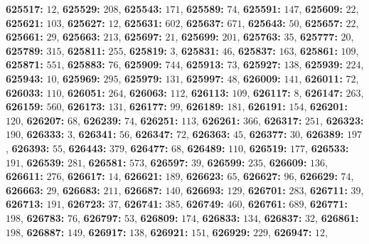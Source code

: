 \textsf{\bfseries 625517:} $12$, \textsf{\bfseries 625529:} $208$, \textsf{\bfseries 625543:} $171$, \textsf{\bfseries 625589:} $74$, \textsf{\bfseries 625591:} $147$, \textsf{\bfseries 625609:} $22$, \textsf{\bfseries 625621:} $103$, \textsf{\bfseries 625627:} $12$, \textsf{\bfseries 625631:} $602$, \textsf{\bfseries 625637:} $671$, \textsf{\bfseries 625643:} $50$, \textsf{\bfseries 625657:} $22$, \textsf{\bfseries 625661:} $29$, \textsf{\bfseries 625663:} $213$, \textsf{\bfseries 625697:} $21$, \textsf{\bfseries 625699:} $201$, \textsf{\bfseries 625763:} $35$, \textsf{\bfseries 625777:} $20$, \textsf{\bfseries 625789:} $315$, \textsf{\bfseries 625811:} $255$, \textsf{\bfseries 625819:} $3$, \textsf{\bfseries 625831:} $46$, \textsf{\bfseries 625837:} $163$, \textsf{\bfseries 625861:} $109$, \textsf{\bfseries 625871:} $551$, \textsf{\bfseries 625883:} $76$, \textsf{\bfseries 625909:} $744$, \textsf{\bfseries 625913:} $73$, \textsf{\bfseries 625927:} $138$, \textsf{\bfseries 625939:} $224$, \textsf{\bfseries 625943:} $10$, \textsf{\bfseries 625969:} $295$, \textsf{\bfseries 625979:} $131$, \textsf{\bfseries 625997:} $48$, \textsf{\bfseries 626009:} $141$, \textsf{\bfseries 626011:} $72$, \textsf{\bfseries 626033:} $110$, \textsf{\bfseries 626051:} $264$, \textsf{\bfseries 626063:} $112$, \textsf{\bfseries 626113:} $109$, \textsf{\bfseries 626117:} $8$, \textsf{\bfseries 626147:} $263$, \textsf{\bfseries 626159:} $560$, \textsf{\bfseries 626173:} $131$, \textsf{\bfseries 626177:} $99$, \textsf{\bfseries 626189:} $181$, \textsf{\bfseries 626191:} $154$, \textsf{\bfseries 626201:} $120$, \textsf{\bfseries 626207:} $68$, \textsf{\bfseries 626239:} $74$, \textsf{\bfseries 626251:} $113$, \textsf{\bfseries 626261:} $366$, \textsf{\bfseries 626317:} $251$, \textsf{\bfseries 626323:} $190$, \textsf{\bfseries 626333:} $3$, \textsf{\bfseries 626341:} $56$, \textsf{\bfseries 626347:} $72$, \textsf{\bfseries 626363:} $45$, \textsf{\bfseries 626377:} $30$, \textsf{\bfseries 626389:} $197$, \textsf{\bfseries 626393:} $55$, \textsf{\bfseries 626443:} $379$, \textsf{\bfseries 626477:} $68$, \textsf{\bfseries 626489:} $110$, \textsf{\bfseries 626519:} $177$, \textsf{\bfseries 626533:} $191$, \textsf{\bfseries 626539:} $281$, \textsf{\bfseries 626581:} $573$, \textsf{\bfseries 626597:} $39$, \textsf{\bfseries 626599:} $235$, \textsf{\bfseries 626609:} $136$, \textsf{\bfseries 626611:} $276$, \textsf{\bfseries 626617:} $14$, \textsf{\bfseries 626621:} $189$, \textsf{\bfseries 626623:} $65$, \textsf{\bfseries 626627:} $96$, \textsf{\bfseries 626629:} $74$, \textsf{\bfseries 626663:} $29$, \textsf{\bfseries 626683:} $211$, \textsf{\bfseries 626687:} $140$, \textsf{\bfseries 626693:} $129$, \textsf{\bfseries 626701:} $283$, \textsf{\bfseries 626711:} $39$, \textsf{\bfseries 626713:} $191$, \textsf{\bfseries 626723:} $37$, \textsf{\bfseries 626741:} $385$, \textsf{\bfseries 626749:} $460$, \textsf{\bfseries 626761:} $689$, \textsf{\bfseries 626771:} $198$, \textsf{\bfseries 626783:} $76$, \textsf{\bfseries 626797:} $53$, \textsf{\bfseries 626809:} $174$, \textsf{\bfseries 626833:} $134$, \textsf{\bfseries 626837:} $32$, \textsf{\bfseries 626861:} $198$, \textsf{\bfseries 626887:} $149$, \textsf{\bfseries 626917:} $138$, \textsf{\bfseries 626921:} $151$, \textsf{\bfseries 626929:} $229$, \textsf{\bfseries 626947:} $12$, 

